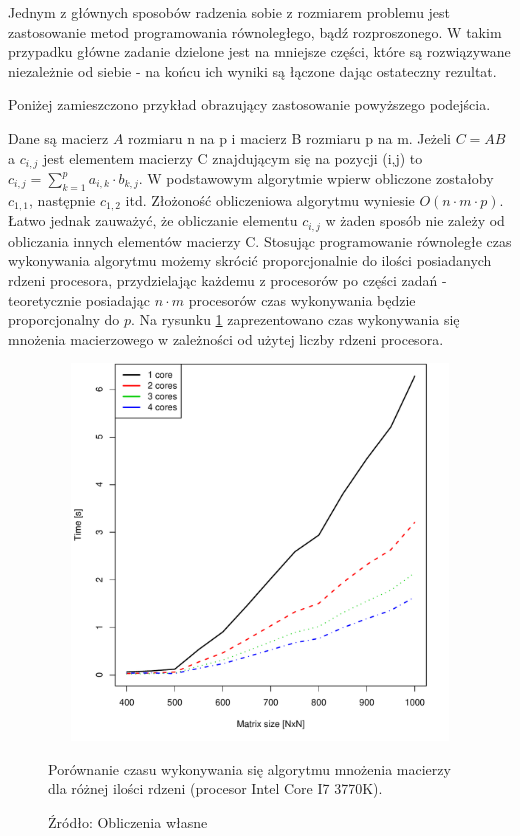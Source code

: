 \documentclass[man,mfu]{mgrwms}
\begin{document}
Jednym z głównych sposobów radzenia sobie z rozmiarem problemu jest zastosowanie metod programowania równoległego, bądź rozproszonego. W takim przypadku główne zadanie dzielone jest na mniejsze części, które są rozwiązywane niezależnie od siebie - na końcu ich wyniki są łączone dając ostateczny rezultat.

Poniżej zamieszczono przykład obrazujący zastosowanie powyższego podejścia.

Dane są macierz $A$ rozmiaru n na p i macierz B rozmiaru p na m. Jeżeli $C = AB$ a $c_{i,j}$ jest elementem macierzy C znajdującym się na pozycji (i,j) to $c_{i,j} = \sum_{k=1}^{p} a_{i,k} \cdot b_{k,j}$. W podstawowym algorytmie wpierw obliczone zostałoby $c_{1,1}$, następnie $c_{1,2}$ itd. Złożoność obliczeniowa algorytmu wyniesie $O(n \cdot m \cdot p)$. Łatwo jednak zauważyć, że obliczanie elementu $c_{i,j}$ w żaden sposób nie zależy od obliczania innych elementów macierzy C. Stosując programowanie równoległe czas wykonywania algorytmu możemy skrócić proporcjonalnie do ilości posiadanych rdzeni procesora, przydzielając każdemu z procesorów po części zadań - teoretycznie posiadając $n \cdot m $ procesorów czas wykonywania będzie proporcjonalny do $p$. Na rysunku \ref{cores} zaprezentowano czas wykonywania się mnożenia macierzowego w zależności od użytej liczby rdzeni procesora.

\begin{figure}[H]
\centering
\includegraphics[width=120mm,height = 100mm]{multicore}
\caption{Porównanie czasu wykonywania się algorytmu mnożenia macierzy dla różnej ilości rdzeni (procesor Intel Core I7 3770K).}
\caption*{Źródło: Obliczenia własne}
\label{cores}
\end{figure}
\end{document}
